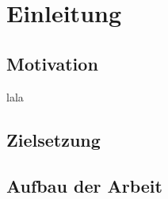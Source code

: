 \section{Einleitung}

\subsection{Motivation}
lala

\subsection{Zielsetzung}

\subsection{Aufbau der Arbeit}






